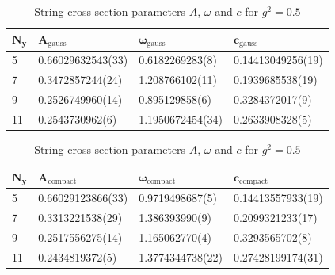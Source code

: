 \begin{table}[!hb]
\centering
\begin{tabular}{llll}
    $\mathbf{N_y}$ & $\mathbf{A_\mathrm{gauss}}$ & $\mathbf{\omega_\mathrm{gauss}}$ & $\mathbf{c_\mathrm{gauss}}$ \\ \hline
   5 & 0.66029632543(33) & 0.6182269283(8) & 0.14413049256(19) \\
   7 & 0.3472857244(24) & 1.208766102(11) & 0.1939685538(19) \\
   9 & 0.2526749960(14) & 0.895129858(6) & 0.3284372017(9) \\
   11 & 0.2543730962(6) & 1.1950672454(34) & 0.2633908328(5) \\
\end{tabular}
\begin{tabular}{llll}
    $\mathbf{N_y}$ & $\mathbf{A_\mathrm{compact}}$ & $\mathbf{\omega_\mathrm{compact}}$ & $\mathbf{c_\mathrm{compact}}$ \\ \hline
   5 & 0.66029123866(33) & 0.9719498687(5) & 0.14413557933(19) \\
   7 & 0.3313221538(29) & 1.386393990(9) & 0.2099321233(17) \\
   9 & 0.2517556275(14) & 1.165062770(4) & 0.3293565702(8) \\
   11 & 0.2434819372(5) & 1.3774344738(22) & 0.27428199174(31) \\
\end{tabular}
\caption{String cross section parameters $A$, $\omega$ and $c$ for $g^2=0.5$}
\end{table}
